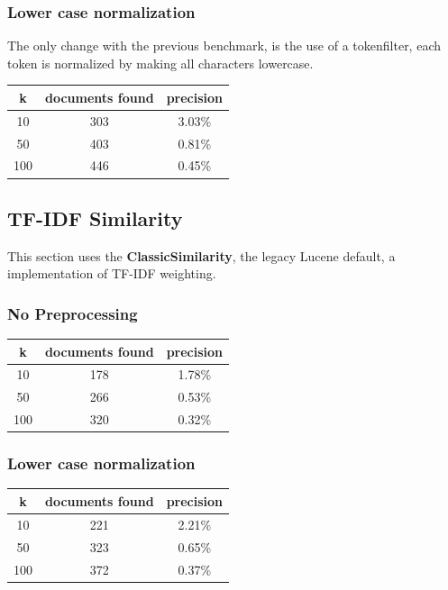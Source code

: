 \documentclass{article}
\begin{document}
\subsubsection{Lower case normalization}
The only change with the previous benchmark, is the use of a tokenfilter, each token is normalized by making all characters lowercase.

\begin{center}
\begin{tabular}{|c|c|c|} \hline
\textbf{k} & \textbf{documents found} & \textbf{precision}\\ \hline
10 & 303 & 3.03\%\\
50 & 403 & 0.81\%\\
100 & 446 & 0.45\%\\ \hline
\end{tabular}
\end{center}

\subsection{TF-IDF Similarity}
This section uses the \textbf{ClassicSimilarity}, the legacy Lucene default, a implementation of TF-IDF weighting.
\subsubsection{No Preprocessing}
\begin{center}
\begin{tabular}{|c|c|c|} \hline
\textbf{k} & \textbf{documents found} & \textbf{precision}\\ \hline
10 & 178 & 1.78\%\\
50 & 266 & 0.53\%\\
100 & 320 & 0.32\%\\ \hline

\end{tabular}
\end{center}

\subsubsection{Lower case normalization}
\begin{center}
\begin{tabular}{|c|c|c|} \hline
\textbf{k} & \textbf{documents found} & \textbf{precision}\\ \hline
10 & 221 & 2.21\%\\
50 & 323 & 0.65\%\\
100 & 372 & 0.37\%\\ \hline

\end{tabular}
\end{center}
\end{document}
